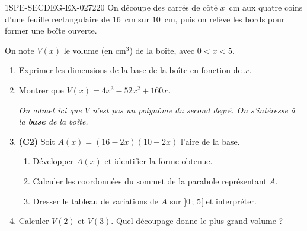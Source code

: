 \begin{exercice}{1SPE-SECDEG-EX-027}{2}{20}
On découpe des carrés de côté $x$~cm aux quatre coins d'une feuille rectangulaire de $16$~cm sur $10$~cm, puis on relève les bords pour former une boîte ouverte.

On note $V(x)$ le volume (en cm$^3$) de la boîte, avec $0 < x < 5$.

\begin{enumerate}
  \item Exprimer les dimensions de la base de la boîte en fonction de $x$.
  \item Montrer que $V(x) = 4x^3 - 52x^2 + 160x$.

  \textit{On admet ici que $V$ n'est pas un polynôme du second degré. On s'intéresse à la \textbf{base} de la boîte.}

  \item \textbf{(C2)} Soit $A(x) = (16-2x)(10-2x)$ l'aire de la base.
  \begin{enumerate}
    \item Développer $A(x)$ et identifier la forme obtenue.
    \item Calculer les coordonnées du sommet de la parabole représentant $A$.
    \item Dresser le tableau de variations de $A$ sur $]0\,;\,5[$ et interpréter.
  \end{enumerate}
  \item Calculer $V(2)$ et $V(3)$. Quel découpage donne le plus grand volume ?
\end{enumerate}
\end{exercice}
